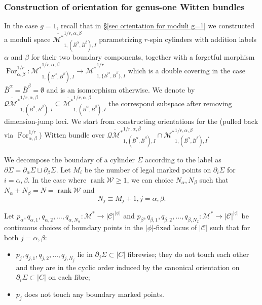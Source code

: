 \documentclass[11pt,a4paper]{article}
\theoremstyle{definition}
\theoremstyle{remark}
\numberwithin{equation}{section}
\def\Mstar{{{\mathcal M^*}}}
\def\Mbarstar{{\overline{\mathcal M^*}}}
\begin{document}
\subsubsection{Construction of orientation for genus-one Witten bundles}
In the case $g=1$, recall that in \S \ref{sec orientation for moduli g=1} we constructed a moduli space $\Mbarstar^{1/r,\alpha,\beta}_{1,(\bar{B}^\alpha,\bar{B}^\beta),I}$ parametrizing $r$-spin cylinders with addition labels $\alpha$ and $\beta$ for their two boundary components, together with  a forgetful morphism $\operatorname{For}^{1/r}_{\alpha,\beta}\colon \Mbarstar^{1/r,\alpha,\beta}_{1,(\bar{B}^\alpha,\bar{B}^\beta),I}\to \mathcal \Mbarstar^{1/r}_{1,\{\bar{B}^\alpha,\bar{B}^\beta\},I}$ which is a double covering in the case $\bar{B}^\alpha=\bar{B}^\beta=\emptyset$ and is an isomorphism otherwise. 
We denote by $\overline{\mathcal{QM}^*}^{1/r,\alpha,\beta}_{1,(\bar{B}^\alpha,\bar{B}^\beta),I}\subseteq\Mbarstar^{1/r,\alpha,\beta}_{1,(\bar{B}^\alpha,\bar{B}^\beta),I}$ the correspond subspace after removing dimension-jump loci. 
We start from constructing orientations for the (pulled back via $\operatorname{For}^{1/r}_{\alpha,\beta}$) Witten bundle over $\overline{\mathcal{QM}^*}^{1/r,\alpha,\beta}_{1,(\bar{B}^\alpha,\bar{B}^\beta),I}\cap \Mstar^{1/r,\alpha,\beta}_{1,(\bar{B}^\alpha,\bar{B}^\beta),I}$. 

We decompose the boundary of a cylinder $\Sigma$ according to the label as $\partial \Sigma=\partial_\alpha\Sigma\sqcup \partial_\beta\Sigma$. Let $M_i$ be the number of legal marked points on $\partial_i \Sigma$ for $i=\alpha,\beta$. In the case where $\operatorname{rank} \mathcal W \ge 1$, we can choice $N_\alpha,N_\beta$ such that $N_\alpha+N_\beta=N=\operatorname{rank} \mathcal W$ and 
\begin{equation}\label{eq choice of N1 N2}
    N_j\equiv M_j+1, j=\alpha,\beta. 
\end{equation}

Let $p_\alpha,q_{\alpha,1},q_{\alpha,2},\dots,q_{\alpha,{N_\alpha}}\colon \mathcal M^*\to \lvert \mathcal C \rvert^{\lvert \phi\rvert}$ and $p_\beta,q_{\beta,1},q_{\beta,2},\dots,q_{\beta,{N_2}}\colon \mathcal M^*\to \lvert \mathcal C \rvert^{\lvert \phi\rvert}$ be continuous choices of boundary points 
in the $\lvert \phi\rvert$-fixed locus of $\lvert \mathcal C \rvert$  such that for both $j=\alpha,\beta$:
\begin{itemize}
    \item  $p_j,q_{j,1},q_{j,2},\dots,q_{j,{N_j}}$ lie in $\partial_j \Sigma\subset \lvert C\rvert$ fibrewise; they do not touch each other and they are in the cyclic order induced by the canonical orientation on $\partial_i \Sigma\subset \lvert C\rvert$ on each fibre;
    \item $p_j$ does not touch any boundary marked points.
\end{itemize}
\end{document}
